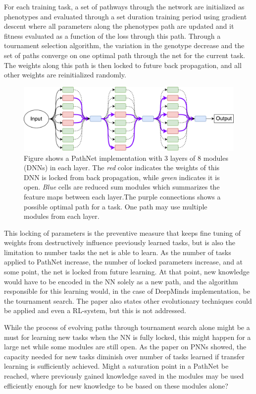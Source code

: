 \documentclass[a4paper,english]{report}
\begin{document}
For each training task, a set of pathways through the network are initialized as phenotypes and evaluated through a set duration training period using gradient descent where all parameters along the phenotypes path are updated and it fitness evaluated as a function of the loss through this path. Through a tournament selection algorithm, the variation in the genotype decrease and the set of paths converge on one optimal path through the net for the current task. The weights along this path is then locked to future back propagation, and all other weights are reinitialized randomly.
\begin{figure}[t]
    \label{fig:pathnet}
    \includegraphics[width=\textwidth]{figures/PathNet.pdf}
    \caption{Figure shows a PathNet implementation with 3 layers of 8 modules (DNNs) in each layer. The \textit{red} color indicates the weights of this DNN is locked from back propagation, while \textit{green} indicates it is open. \textit{Blue} cells are reduced sum modules which summarizes the feature maps between each layer.The purple connections shows a possible optimal path for a task. One path may use multiple modules from each layer.}
\end{figure}
This locking of parameters is the preventive measure that keeps fine tuning of weights from destructively influence previously learned tasks, but is also the limitation to number tasks the net is able to learn. As the number of tasks applied to PathNet increase, the number of locked parameters increase, and at some point, the net is locked from future learning. At that point, new knowledge would have to be encoded in the NN solely as a new path, and the algorithm responsible for this learning would, in the case of DeepMinds implementation, be the tournament search. The paper also states other evolutionary techniques could be applied and even a RL-system, but this is not addressed.

While the process of evolving paths through tournament search alone might be a must for learning new tasks when the NN is fully locked, this might happen for a large net while some modules are still open. As the paper on PNNs showed, the capacity needed for new tasks diminish over number of tasks learned if transfer learning is sufficiently achieved. Might a saturation point in a PathNet be reached, where previously gained knowledge saved in the modules may be used efficiently enough for new knowledge to be based on these modules alone? 
\end{document}

